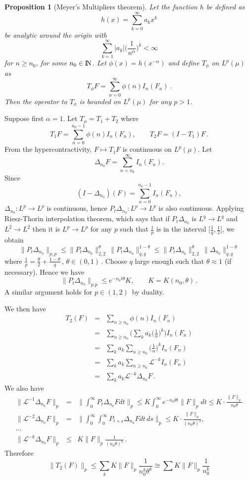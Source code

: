 \documentclass[12pt,a4paper]{book}
\newtheorem{proposition}[theorem]{Proposition}
\newcommand{\N}{{\rm I\!N}}
\newcommand{\proof}{\noindent {\bf Proof:\ }}
\begin{document}
\begin{proposition}[Meyer's Multipliers theorem]
Let the function $h$ be defined as
$$
h(x)=\sum_{k=0}^\infty a_k x^k
$$
be  analytic around the origin with
$$
\sum_{k=1}^\infty |a_k|\Big(\frac{1}{n^\alpha}\Big)^k<\infty
$$
for $n\geq n_0$, for some
$n_0\in\N$. Let $\phi(x)=h(x^{-\alpha})$ and define $T_\phi$ on $L^p(\mu)$ as
$$
T_\phi F=\sum_{n=0}^\infty \phi(n)I_n(F_n)\,.
$$
Then the operator to $T_\phi$ is bounded on $L^p(\mu)$ for any $p>1$.
\end{proposition}
\proof
Suppose first $\alpha=1$. Let $T_\phi=T_1+T_2$ where
$$
T_1F=\sum_{n=0}^{n_0-1}\phi(n)I_n(F_n),\qquad T_2F=(I-T_1)F\,.
$$
From the hypercontractivity, $F\mapsto T_1F$ is continuous on $L^p(\mu)$. Let
$$
\Delta_{n_0}F=\sum_{n=n_0}^\infty I_n(F_n).
$$
 Since
$$
(I-\Delta_{n_0})(F)=\sum_{n=0}^{n_0-1}I_n(F_n),
$$
$\Delta_{n_0}:L^p\to L^p$ is
continuous, hence $P_t\Delta_{n_0}:L^p\to L^p$ is also continuous. Applying
Riesz-Thorin interpolation theorem, which says that if
$P_t\Delta_{n_0}$ is $L^q\to
L^q$ and $L^2\to L^2$ then it is $L^p\to L^p$ for any $p$ such that
$\frac{1}{p}$ is in the interval $\Big[\frac{1}{q},\frac{1}{2}\Big]$,
we obtain
$$
\|P_t\Delta_{n_0}\|_{p,p}\leq \|P_t\Delta_{n_0}\|_{2,2}^\theta\,
\|P_t\Delta_{n_0}\|_{q,q}^{1-\theta}\leq \|P_t\Delta_{n_0}\|_{2,2}^\theta\,
\|\Delta_{n_0}\|_{q,q}^{1-\theta}
$$
where $\frac{1}{p}=\frac{\theta}{2}+\frac{1-\theta}{q}\,$, $\theta\in(0,1)\,$.
Choose $q$ large enough such that  $\theta\approx1$ (if necessary). Hence we have
$$
\|P_t\Delta_{n_0}\|_{p.p}\leq e^{-n_0t\theta}K,\qquad K=K(n_0,\theta)\,.
$$
A similar argument  holds for $p\in(1,2)\,$ by duality.

We then  have
\begin{eqnarray*}
T_2(F) & = & \sum_{n\geq n_0}\phi(n)I_n(F_n)\\
& = & \sum_{n\geq n_0}\Big(\sum_k a_k\Big(\frac{1}{n}\Big)^k\Big) I_n(F_n) \\
& = & \sum_k a_k\sum_{n\geq n_0}\Big(\frac{1}{n}\Big)^kI_n(F_n) \\
& = & \sum_k a_k\sum_{n\geq n_0}{\mathcal L}^{-k}I_n(F_n) \\
& = & \sum_k a_k{\mathcal L}^{-k}\Delta_{n_0}F\,.
\end{eqnarray*}
We also have
\begin{eqnarray*}
\|{\mathcal L}^{-1}\Delta_{n_0}F\|_p & = & \Big\|\int_0^\infty
    P_t\Delta_{n_0} Fdt\Big\|_p \leq K \int_0^\infty e^{-n_0\theta t}
              \|F\|_p dt\leq K\cdot\frac{\|F\|_p}{n_0\theta} \\
\|{\mathcal L}^{-2}\Delta_{n_0}F\|_p & = & \Big\|\int_0^\infty
\int_0^\infty
     P_{t+s}\Delta_{n_0} Fdt\,ds\Big\|_p \leq K\cdot\frac{\|F\|_p}{(n_0\theta)^2}, \\
\cdots\\
\|{\mathcal L}^{-k}\Delta_{n_0}F\|_p &\leq &K\|F\|_p \frac{1}{(n_0\theta)^k}\,.
\end{eqnarray*}
Therefore
$$
\|T_2(F)\|_p\leq\sum_k K\|F\|_p\frac{1}{n_0^k\theta^k} \cong \sum
K\|F\|_p\frac{1}{n_0^k}
$$
\end{document}
